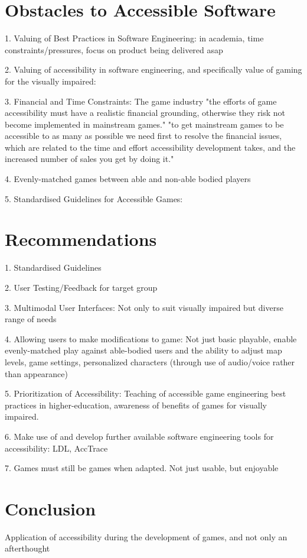 \documentclass{scrartcl}
\begin{document}
\section{Obstacles to Accessible Software}

1.	Valuing of Best Practices in Software Engineering: in academia, time constraints/pressures, focus on product being delivered asap

2.	Valuing of accessibility in software engineering, and specifically value of gaming for the visually impaired:

3.	Financial and Time Constraints: 
The game industry "the efforts of game accessibility must have a realistic financial grounding, otherwise they risk not become implemented in mainstream games." "to get mainstream games to be accessible to as many as possible we need first to resolve the financial issues, which are related to the time and effort accessibility development takes, and the increased number of sales you get by doing it." \cite{14}

4.	Evenly-matched games between able and non-able bodied players

5.	Standardised Guidelines for Accessible Games:

\section{Recommendations}

1.	Standardised Guidelines

2.	User Testing/Feedback for target group

3.	Multimodal User Interfaces: Not only to suit visually impaired but diverse range of needs

4.	Allowing users to make modifications to game: Not just basic playable, enable evenly-matched play against able-bodied users and the ability to adjust map levels, game settings, personalized characters (through use of audio/voice rather than appearance)

5.	Prioritization of Accessibility: Teaching of accessible game engineering best practices in higher-education, awareness of benefits of games for visually impaired.

6.	Make use of and develop further available software engineering tools for accessibility: LDL, AccTrace

7.	Games must still be games when adapted. Not just usable, but enjoyable

\section{Conclusion}

Application of accessibility during the development of games, and not only an afterthought




\end{document}
